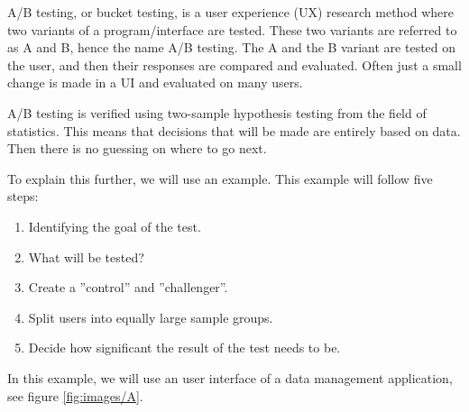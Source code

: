 
A/B testing, or bucket testing, is a user experience (UX) research method where two variants of a program/interface are tested. These two variants are referred to as A and B, hence the name A/B testing. The A and the B variant are tested on the user, and then their responses are compared and evaluated. Often just a small change is made in a UI and evaluated on many users. 

A/B testing is verified using two-sample hypothesis testing from the field of statistics. This means that decisions that will be made are entirely based on data. Then there is no guessing on where to go next.

To explain this further, we will use an example.
This example will follow five steps: 
\begin{enumerate}
  \item Identifying the goal of the test. 
  \item What will be tested? 
 \item Create a ''control'' and ''challenger''. 
 \item Split users into equally large sample groups.
 \item Decide how significant the result of the test needs to be.
\end{enumerate}
 
In this example, we will use an user interface of a data management application, see figure \ref{fig:images/A}. 

